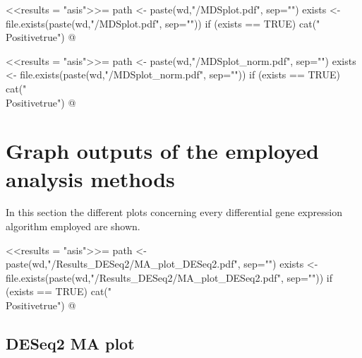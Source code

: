 \documentclass{article}
\begin{document}
\newif\ifPositive

<<results = "asis">>=
path <- paste(wd,"/MDSplot.pdf", sep="")
exists <- file.exists(paste(wd,"/MDSplot.pdf", sep=""))
if (exists == TRUE) {
  cat("\\Positivetrue")
}
@

\ifPositive
  \subsection{Multidimensional Scaling (MDS) plots}

    This is an MDS plot before normalization of the count data (Image extracted from {\bf"MDSplot.pdf"} file):
    \begin{center}
      \texttt{[image: \\Sexpr\{path]}}
    \end{center}
\fi



\newif\ifPositive

<<results = "asis">>=
path <- paste(wd,"/MDSplot_norm.pdf", sep="")
exists <- file.exists(paste(wd,"/MDSplot_norm.pdf", sep=""))
if (exists == TRUE) {
  cat("\\Positivetrue")
}
@

\ifPositive
  This is an MDS plot after normalization of the count data (Image extracted from {\bf"MDSplot\_norm.pdf"} file):
  \begin{center}
    \texttt{[image: \\Sexpr\{path]}}
  \end{center}
  In case that the samples of the experimental conditions tested are not grouped as expected, perhaps it would be advisable repeating the experiment without the problematic sample(s).
\fi


\section{Graph outputs of the employed analysis methods}

In this section the different plots concerning every differential gene expression algorithm employed are shown.


\newif\ifPositive

<<results = "asis">>=
path <- paste(wd,"/Results_DESeq2/MA_plot_DESeq2.pdf", sep="")
exists <- file.exists(paste(wd,"/Results_DESeq2/MA_plot_DESeq2.pdf", sep=""))
if (exists == TRUE) {
  cat("\\Positivetrue")
}
@

\ifPositive
  \subsection{DESeq2 MA plot}
\end{document}
